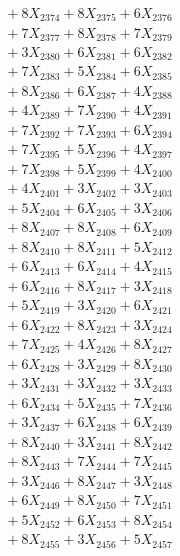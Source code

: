 \documentclass[a4paper,10pt]{article}
\begin{document}
{\begin{align}
&\;  + 8 X_{2374} + 8 X_{2375} + 6 X_{2376} \\[0.3ex]
&\;  + 7 X_{2377} + 8 X_{2378} + 7 X_{2379} \\[0.5ex]\allowbreak
&\;  + 3 X_{2380} + 6 X_{2381} + 6 X_{2382} \\[0.3ex]
&\;  + 7 X_{2383} + 5 X_{2384} + 6 X_{2385} \\[0.3ex]
&\;  + 8 X_{2386} + 6 X_{2387} + 4 X_{2388} \\[0.3ex]
&\;  + 4 X_{2389} + 7 X_{2390} + 4 X_{2391} \\[0.3ex]
&\;  + 7 X_{2392} + 7 X_{2393} + 6 X_{2394} \\[0.3ex]
&\;  + 7 X_{2395} + 5 X_{2396} + 4 X_{2397} \\[0.3ex]
&\;  + 7 X_{2398} + 5 X_{2399} + 4 X_{2400} \\[0.3ex]
&\;  + 4 X_{2401} + 3 X_{2402} + 3 X_{2403} \\[0.3ex]
&\;  + 5 X_{2404} + 6 X_{2405} + 3 X_{2406} \\[0.3ex]
&\;  + 8 X_{2407} + 8 X_{2408} + 6 X_{2409} \\[0.5ex]\allowbreak
&\;  + 8 X_{2410} + 8 X_{2411} + 5 X_{2412} \\[0.3ex]
&\;  + 6 X_{2413} + 6 X_{2414} + 4 X_{2415} \\[0.3ex]
&\;  + 6 X_{2416} + 8 X_{2417} + 3 X_{2418} \\[0.3ex]
&\;  + 5 X_{2419} + 3 X_{2420} + 6 X_{2421} \\[0.3ex]
&\;  + 6 X_{2422} + 8 X_{2423} + 3 X_{2424} \\[0.3ex]
&\;  + 7 X_{2425} + 4 X_{2426} + 8 X_{2427} \\[0.3ex]
&\;  + 6 X_{2428} + 3 X_{2429} + 8 X_{2430} \\[0.3ex]
&\;  + 3 X_{2431} + 3 X_{2432} + 3 X_{2433} \\[0.3ex]
&\;  + 6 X_{2434} + 5 X_{2435} + 7 X_{2436} \\[0.3ex]
&\;  + 3 X_{2437} + 6 X_{2438} + 6 X_{2439} \\[0.5ex]\allowbreak
&\;  + 8 X_{2440} + 3 X_{2441} + 8 X_{2442} \\[0.3ex]
&\;  + 8 X_{2443} + 7 X_{2444} + 7 X_{2445} \\[0.3ex]
&\;  + 3 X_{2446} + 8 X_{2447} + 3 X_{2448} \\[0.3ex]
&\;  + 6 X_{2449} + 8 X_{2450} + 7 X_{2451} \\[0.3ex]
&\;  + 5 X_{2452} + 6 X_{2453} + 8 X_{2454} \\[0.3ex]
&\;  + 8 X_{2455} + 3 X_{2456} + 5 X_{2457} \\[0.3ex]

\end{align}}
\end{document}
